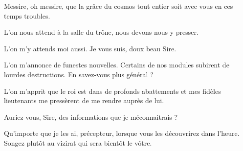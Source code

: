 \nopagebreak[4]
\begin{drama}\nopagebreak[4]
  \nopagebreak[4]\generalspeaks \nopagebreak[4] Messire, oh messire, que la grâce du cosmos tout entier soit avec vous en ces temps troubles.

  \elenaspeaks L’on nous attend à la salle du trône, nous devons nous y presser.

  \generalspeaks L’on m’y attends moi aussi. Je vous suis, doux beau Sire.

  \alexasspeaks L’on m’annonce de funestes nouvelles. Certains de nos modules subirent de lourdes destructions. En savez-vous plus général ?

  \generalspeaks L’on m’apprit que le roi est dans de profonds abattements et mes fidèles lieutenants me pressèrent de me rendre auprès de lui.

  \alexasspeaks {} Auriez-vous, Sire, des informations que je méconnaitrais ?

  \elenaspeaks Qu’importe que je les ai, précepteur, lorsque vous les découvrirez dans l’heure. Songez plutôt au vizirat qui sera bientôt le vôtre.
\end{drama}


\scene


\StageDirII{\roi, \reine, \elena, \alexas, \general, \suivantes, \kingsgards}




